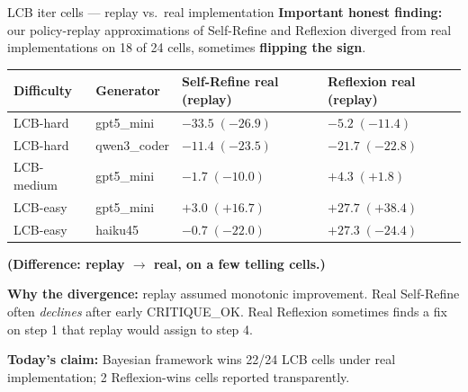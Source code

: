 \documentclass[10pt]{beamer}
\newcommand{\good}[1]{\textcolor{accentGreen}{\textbf{#1}}}
\newcommand{\bad}[1]{\textcolor{accentRed}{\textbf{#1}}}
\newcommand{\warn}[1]{\textcolor{accentOrange}{\textbf{#1}}}
\newcommand{\info}[1]{\textcolor{primaryBlue}{\textbf{#1}}}
\begin{document}
\begin{frame}{LCB iter cells --- replay vs.\ real implementation}
\warn{Important honest finding:} our policy-replay approximations of
Self-Refine and Reflexion diverged from real implementations on 18 of 24
cells, sometimes \bad{flipping the sign}.

\begin{table}
\centering
\scriptsize
\begin{tabular}{p{1.5cm}p{1.5cm}p{2.6cm}p{2.6cm}}
\toprule
\rowcolor{paleBlue}Difficulty & Generator & Self-Refine real (replay) & Reflexion real (replay) \\
\midrule
LCB-hard & gpt5\_mini & \bad{$-33.5\;(-26.9)$} & \warn{$-5.2\;(-11.4)$} \\
LCB-hard & qwen3\_coder & \warn{$-11.4\;(-23.5)$} & \bad{$-21.7\;(-22.8)$} \\
LCB-medium & gpt5\_mini & \warn{$-1.7\;(-10.0)$} & \good{$+4.3\;(+1.8)$} \\
LCB-easy & gpt5\_mini & \good{$+3.0\;(+16.7)$} & \good{$+27.7\;(+38.4)$} \\
LCB-easy & haiku45 & \warn{$-0.7\;(-22.0)$} & \good{$+27.3\;(-24.4)$} \\
\bottomrule
\end{tabular}
\end{table}
\info{(Difference: replay $\to$ real, on a few telling cells.)}
\vspace{0.1cm}

\info{Why the divergence:} replay assumed monotonic improvement. Real
Self-Refine often \emph{declines} after early CRITIQUE\_OK. Real Reflexion
sometimes finds a fix on step 1 that replay would assign to step 4.

\good{Today's claim:} Bayesian framework wins 22/24 LCB cells under real
implementation; 2 Reflexion-wins cells reported transparently.
\end{frame}
\end{document}
